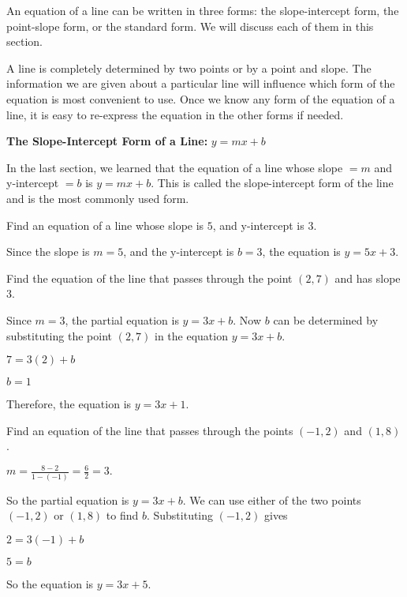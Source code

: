An equation of a line can be written in three forms: the slope-intercept form, the point-slope form, or the standard form. We will discuss each of them in this section.

A line is completely determined by two points or by a point and slope. The information we are given about a particular line will influence which form of the equation is most convenient to use. Once we know any form of the equation of a line, it is easy to re-express the equation in the other forms if needed.

\textbf{The Slope-Intercept Form of a Line:} $y = mx + b$

In the last section, we learned that the equation of a line whose slope $= m$ and y-intercept $= b$ is $y = mx + b$. This is called the slope-intercept form of the line and is the most commonly used form.

\begin{example}
Find an equation of a line whose slope is $5$, and y-intercept is $3$.
\end{example}

\begin{solution}
Since the slope is $m = 5$, and the y-intercept is $b = 3$, the equation is $y = 5x + 3$.
\end{solution}

\begin{example}
Find the equation of the line that passes through the point $(2, 7)$ and has slope $3$.
\end{example}

\begin{solution}
Since $m = 3$, the partial equation is $y = 3x + b$. Now $b$ can be determined by substituting the point $(2, 7)$ in the equation $y = 3x + b$.

$7 = 3(2) + b$

$b = 1$

Therefore, the equation is $y = 3x + 1$.
\end{solution}

\begin{example}
Find an equation of the line that passes through the points $(-1, 2)$ and $(1, 8)$.
\end{example}

\begin{solution}
$m = \frac{8 - 2}{1 - (-1)} = \frac{6}{2} = 3.$

So the partial equation is $y = 3x + b$. We can use either of the two points $(-1, 2)$ or $(1, 8)$ to find $b$. Substituting $(-1, 2)$ gives

$2 = 3(-1) + b$

$5 = b$

So the equation is $y = 3x + 5$.
\end{solution}

